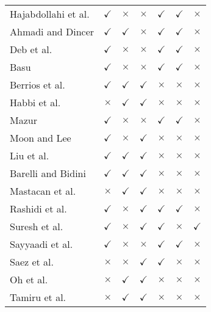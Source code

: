 \begin{table}[h]
\begin{tabular}{p{4.3cm}cccccc}
Hajabdollahi et al. \cite{Haja-2012} & $\checkmark$  &  $\times$ &  $\times$ & $\checkmark$ & $\checkmark$ & $\times$\\
Ahmadi and Dincer \cite{Ahmadi-2011} & $\checkmark$  &  $\checkmark$ &  $\times$ & $\checkmark$ & $\checkmark$ & $\times$\\
Deb et al. \cite{Deb2012} &  $\checkmark$ &  $\times$ &  $\times$ & $\checkmark$ & $\checkmark$ & $\times$\\
Basu \cite{Basu-11} &  $\checkmark$ &  $\times$ &  $\times$ & $\checkmark$ & $\checkmark$ & $\times$\\
Berrios et al. \cite{Berrios-2011} &  $\checkmark$ &  $\checkmark$ &  $\checkmark$ & $\times$ & $\times$ & $\times$\\
Habbi et al. \cite{Habi-2011} &  $\times$ &  $\checkmark$ &  $\checkmark$ & $\times$ & $\times$ & $\times$\\
Mazur \cite{Mazur-2009} &  $\checkmark$ &  $\times$ &  $\times$ & $\checkmark$ & $\checkmark$ & $\times$\\
Moon and Lee \cite{Moon-2011} &  $\checkmark$ &  $\times$ &  $\checkmark$ & $\times$ & $\times$ & $\times$\\
Liu et al. \cite{Liu2010} &  $\checkmark$ &  $\checkmark$ &  $\checkmark$ & $\times$ & $\times$ & $\times$\\
Barelli and Bidini \cite{Bare-2005} &  $\checkmark$ &  $\checkmark$ &  $\checkmark$ & $\times$ & $\times$ & $\times$\\
Mastacan et al. \cite{Mastacan-2005} &  $\times$ &  $\checkmark$ &  $\checkmark$ & $\times$ & $\times$ & $\times$\\
Rashidi et al. \cite{Rashidi-2011} &  $\checkmark$ &  $\times$ &  $\checkmark$ & $\checkmark$ & $\checkmark$ & $\times$\\
Suresh et al. \cite{Suresh-2011} &  $\checkmark$ &  $\times$ &  $\checkmark$ & $\checkmark$ & $\times$ & $\checkmark$\\
Sayyaadi et al. \cite{Sayyaadi-2011} &  $\checkmark$ &  $\times$ &  $\times$ & $\checkmark$ & $\checkmark$ & $\times$\\
Saez et al. \cite{Saez-2007} &  $\times$ &  $\times$ &  $\checkmark$ & $\checkmark$ & $\times$ & $\times$\\
Oh et al. \cite{Kwun-2007} &  $\times$ &  $\checkmark$ &  $\checkmark$ & $\times$ & $\times$ & $\times$\\
Tamiru et al. \cite{Tamiru-2009} &  $\times$ &  $\checkmark$ &  $\checkmark$ & $\times$ & $\times$ & $\times$\\
 \bottomrule
 \end{tabular}
\end{table}

